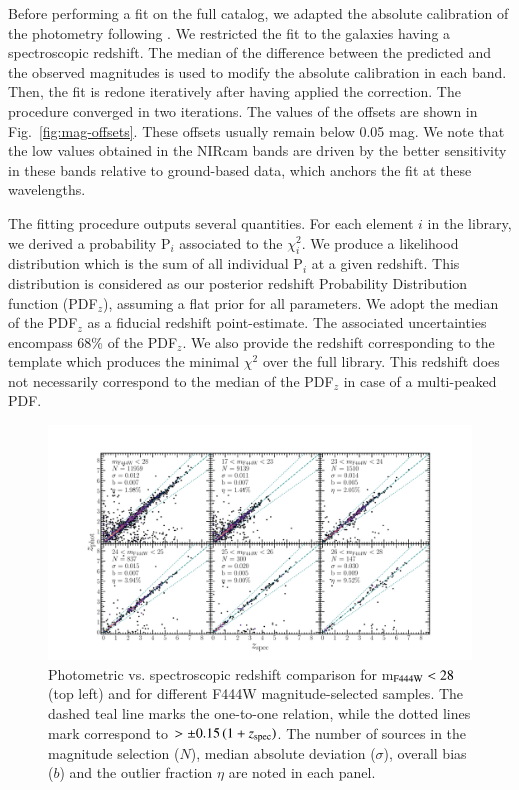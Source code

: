 \documentclass[longauth]{aa}
\begin{document}
Before performing a fit on the full catalog, we adapted the absolute calibration of the photometry following \citet{ilbert_accurate_2006}. We restricted the fit to the galaxies having a spectroscopic redshift. The median of the difference between the predicted and the observed magnitudes is used to modify the absolute calibration in each band. Then, the fit is redone iteratively after having applied the correction. The procedure converged in two iterations. The values of the offsets are shown in Fig.~\ref{fig:mag-offsets}. These offsets usually remain below 0.05 mag. We note that the low values obtained in the NIRcam bands are driven by the better sensitivity in these bands relative to ground-based data, which anchors the fit at these wavelengths. 

The fitting procedure outputs several quantities. For each element $i$ in the library, we derived a probability P$_i$ associated to the $\chi^2_i$.  We produce a likelihood distribution which is the sum of all individual P$_i$ at a given redshift. This distribution is considered as our posterior redshift Probability Distribution function (PDF$_z$), 
assuming a flat prior for all parameters. We adopt the median of the PDF$_z$ as a fiducial redshift point-estimate. The associated uncertainties encompass 68\% of the PDF$_z$. We also provide the redshift corresponding to the template which produces the minimal $\chi^2$ over the full library. This redshift does not necessarily correspond to the median of the PDF$_z$ in case of a multi-peaked PDF.


\begin{figure}[t!]
\includegraphics[width=1\textwidth, trim=0cm 0.8cm 0cm 2cm, clip]{figures/specz-vs-photz.pdf}
\caption{Photometric vs. spectroscopic redshift comparison for m$_{\rm F444W} < 28$ (top left) and for different F444W magnitude-selected samples. The dashed teal line marks the one-to-one relation, while the dotted lines mark correspond to \zphot $> \pm 0.15\,(1+z_{\rm spec})$. The number of sources in the magnitude selection ($N$), median absolute deviation ($\sigma$), overall bias ($b$) and the outlier fraction $\eta$ are noted in each panel.
}
\label{fig:photoz-specz}
\end{figure}
\end{document}

